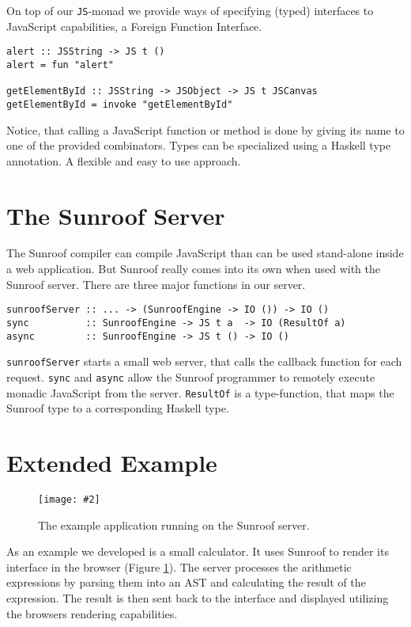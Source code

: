 \documentclass{llncs}
\newcommand{\Src}[1]{{\tt{#1}}}
\newcommand{\FigureS}[4]{%
\begin{figure}[h]%
\vspace{-0.5cm}%
\begin{center}%
\texttt{[image: \#2]}%
\vspace{-0.5cm}%
\end{center}%
\caption{#3}%
\label{#1}%
\vspace{-0.5cm}%
\end{figure}%
}
\begin{document}
On top of our \Src{JS}-monad we provide ways of specifying (typed)
interfaces to JavaScript capabilities, a Foreign Function Interface.
\begin{verbatim}
alert :: JSString -> JS t ()
alert = fun "alert"

getElementById :: JSString -> JSObject -> JS t JSCanvas
getElementById = invoke "getElementById"
\end{verbatim}
Notice, that calling a JavaScript function or method is done by giving its
name to one of the provided combinators. Types can be specialized using 
a Haskell type annotation. A flexible and easy to use approach.

\section{The Sunroof Server}

The Sunroof compiler can compile JavaScript than can be used
stand-alone inside a web application. But Sunroof really comes
into its own when used with the Sunroof server. There
are three major functions in our server.

\begin{verbatim}
sunroofServer :: ... -> (SunroofEngine -> IO ()) -> IO ()
sync          :: SunroofEngine -> JS t a  -> IO (ResultOf a)
async         :: SunroofEngine -> JS t () -> IO ()
\end{verbatim}        

\Src{sunroofServer} starts a small web server,
that calls the callback function for each request.
\Src{sync} and \Src{async} allow the Sunroof programmer
to remotely execute monadic JavaScript from the server.
\Src{ResultOf} is a type-function, that maps the 
Sunroof type to a corresponding Haskell type.

\section{Extended Example}

\FigureS%
{fig:example-application}%
{../figures/example-application.png}%
{The example application running on the Sunroof server.}%
{scale=0.8}

As an example we developed is a small calculator. It uses Sunroof to
render its interface in the browser (Figure \ref{fig:example-application}). The 
server processes the arithmetic expressions by parsing them
into an AST and calculating the result of the expression.
The result is then sent back to the interface and displayed 
utilizing the browsers rendering capabilities.


%
%



\end{document}
